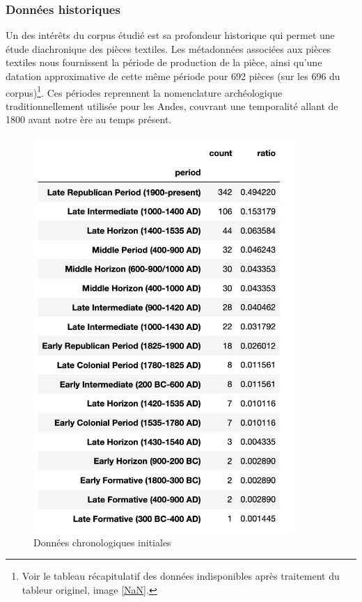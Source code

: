 \clearpage


\subsubsection{Données historiques}

Un des intérêts du corpus étudié est sa profondeur historique qui permet une étude diachronique des pièces textiles. Les métadonnées associées aux pièces textiles nous fournissent la période de production de la pièce, ainsi qu'une datation approximative de cette même période pour 692 pièces (sur les 696 du corpus)\footnote{Voir le tableau récapitulatif des données indisponibles après traitement du tableur originel, image \ref{NaN}.}. Ces périodes reprennent la nomenclature archéologique traditionnellement utilisée pour les Andes, couvrant une temporalité allant de 1800 avant notre ère au temps présent.

\begin{figure}[!h]
	\begin{center}
		\includegraphics[width=10cm]{../images/periods_orig.png}
           	 \caption{Données chronologiques initiales}
           	 \label{chronoInit}
	 \end{center}
  \end{figure}
  
